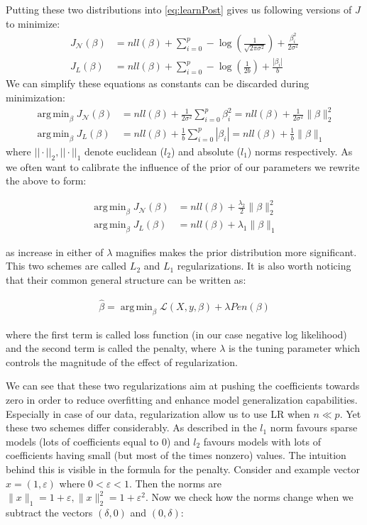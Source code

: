 \documentclass[12pt, wide]{mwart}
\DeclareMathOperator*{\argmin}{arg\,min}
\begin{document}
Putting these two distributions into \ref{eq:learnPost} gives us following versions of $J$ to minimize:
\begin{align*}
    J_{\mathcal{N}}(\beta) &= nll(\beta) + \sum_{i=0}^p -\log \left(\frac{1}{\sqrt{2 \pi \sigma^{2}}} \right) + \frac{\beta_i^{2}}{2 \sigma^{2}} \\
    J_{L}(\beta) &= nll(\beta) + \sum_{i=0}^p -\log \left(\frac{1}{2 b} \right) + \frac{|\beta_i|}{b}
\end{align*}
We can simplify these equations as constants can be discarded during minimization:
\begin{align*}
    \argmin_{\beta} J_{\mathcal{N}}(\beta) &= nll(\beta) + \frac{1}{2 \sigma^2}\sum_{i=0}^p \beta_i^{2} = nll(\beta) + \frac{1}{2 \sigma^2}\| \beta \|_2^2\\ 
    \argmin_{\beta} J_{L}(\beta) &= nll(\beta) + \frac{1}{b}\sum_{i=0}^p |\beta_i| = nll(\beta) + \frac{1}{b}\| \beta\|_1 
\end{align*}
where $||\cdot||_2, ||\cdot||_1$ denote euclidean ($l_2$) and absolute ($l_1$) norms respectively. As we often want to calibrate the influence of the prior of our parameters we rewrite the above to form: 

\begin{align*}
    \argmin_{\beta} J_{\mathcal{N}}(\beta) &=  nll(\beta) + \frac{\lambda_2}{2}\| \beta \|_2^2\\ 
    \argmin_{\beta} J_{L}(\beta) &= nll(\beta) + \lambda_1\| \beta\|_1 
\end{align*}

as increase in either of $\lambda$ magnifies makes the prior distribution more significant. This two schemes are called $L_2$ and $L_1$ regularizations. It is also worth noticing that their common general structure can be written as:

\begin{align}
    \hat{\beta} = \argmin_{\beta} \mathcal{L}(X,y, \beta) + \lambda Pen(\beta) \label{eq:loss+pen}
\end{align}

where the first term is called loss function (in our case negative log likelihood) and the second term is called the penalty, where $\lambda$ is the tuning parameter which controls the magnitude of the effect of regularization.

We can see that these two regularizations aim at pushing the coefficients towards zero in order to reduce overfitting and enhance model generalization capabilities. Especially in case of our data, regularization allow us to use LR when $n \ll p$. Yet these two schemes differ considerably. As described in \cite[chapter 13.3.1]{MLprob} the $l_1$ norm favours sparse models (lots of coefficients equal to $0$) and $l_2$ favours models with lots of coefficients having small (but most of the times nonzero) values. The intuition behind this is visible in the formula for the penalty. Consider and example vector $x = (1, \varepsilon)$ where $0 < \varepsilon < 1$. Then the norms are $\|x\|_{1}=1+\varepsilon,  \|x\|_{2}^{2}=1+\varepsilon^{2}$. Now we check how the norms change when we subtract the vectors $(\delta, 0)$ and $(0, \delta)$:
\end{document}
